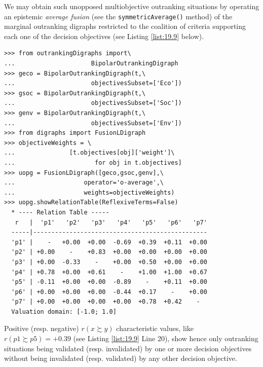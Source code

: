 We may obtain such unopposed multiobjective outranking situations by operating an epistemic \emph{average fusion} (see the \texttt{symmetricAverage()} method) of the marginal outranking digraphs restricted to the coalition of criteria supporting each one of the decision objectives (see Listing \ref{list:19.9} below).
\begin{lstlisting}[caption={Computing unopposed outranking situations},label=list:19.9]
>>> from outrankingDigraphs import\
...                     BipolarOutrankingDigraph
>>> geco = BipolarOutrankingDigraph(t,\
...                     objectivesSubset=['Eco'])
>>> gsoc = BipolarOutrankingDigraph(t,\
...                     objectivesSubset=['Soc'])
>>> genv = BipolarOutrankingDigraph(t,\
...                     objectivesSubset=['Env'])
>>> from digraphs import FusionLDigraph
>>> objectiveWeights = \
...               [t.objectives[obj]['weight']\
...                      for obj in t.objectives] 
>>> uopg = FusionLDigraph([geco,gsoc,genv],\
...                   operator='o-average',\
...                   weights=objectiveWeights)
>>> uopg.showRelationTable(ReflexiveTerms=False)
  * ---- Relation Table -----
   r   |  'p1'   'p2'   'p3'   'p4'   'p5'   'p6'   'p7'   
  -----|------------------------------------------------
  'p1' |    -   +0.00  +0.00  -0.69  +0.39  +0.11  +0.00  
  'p2' | +0.00    -    +0.83  +0.00  +0.00  +0.00  +0.00  
  'p3' | +0.00  -0.33    -    +0.00  +0.50  +0.00  +0.00  
  'p4' | +0.78  +0.00  +0.61    -    +1.00  +1.00  +0.67  
  'p5' | -0.11  +0.00  +0.00  -0.89    -    +0.11  +0.00  
  'p6' | +0.00  +0.00  +0.00  -0.44  +0.17    -    +0.00  
  'p7' | +0.00  +0.00  +0.00  +0.00  +0.78  +0.42    -   
  Valuation domain: [-1.0; 1.0]
\end{lstlisting}
Positive (resp. negative) $r(x \succsim y)$ characteristic values, like $r(p1 \succsim p5) = +0.39$ (see Listing \ref{list:19.9} Line 20), show hence only outranking situations being validated (resp. invalidated) by one or more decision objectives without being invalidated (resp. validated) by any other decision objective.


